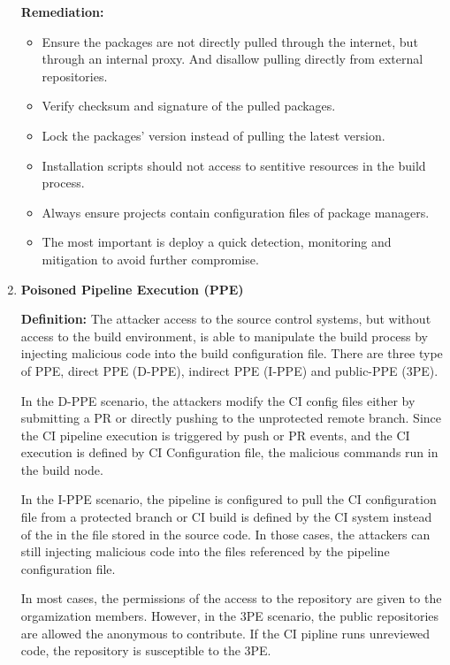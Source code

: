 \begin{enumerate}[label=(\arabic*)]
    \textbf{Remediation:}
        \begin{itemize}
            \item Ensure the packages are not directly pulled through the internet, 
            but through an internal proxy. And disallow pulling directly from external repositories.
            \item Verify checksum and signature of the pulled packages.
            \item Lock the packages' version instead of pulling the latest version.
            \item Installation scripts should not access to 
            sentitive resources in the build process.
            \item Always ensure projects contain configuration files of package managers.
            \item The most important is deploy a quick detection, 
            monitoring and mitigation to avoid further compromise.
        \end{itemize}
    \item \textbf{Poisoned Pipeline Execution (PPE)}

    \textbf{Definition: }
        The attacker access to the source control systems, but without access to the build environment, is
        able to manipulate the build process by injecting malicious code into the build configuration file.
        There are three type of PPE, direct PPE (D-PPE), indirect PPE (I-PPE) and public-PPE (3PE).

        In the D-PPE scenario, the attackers modify the CI config files either by submitting a PR or directly pushing to the unprotected
        remote branch. Since the CI pipeline execution is triggered by push or PR events, and the CI execution
        is defined by CI Configuration file, the malicious commands run in the build node.

        In the I-PPE scenario, the pipeline is configured to pull the CI configuration file from a protected 
        branch or CI build is defined by the CI system instead of the in the file stored in the source code.
        In those cases, the attackers can still injecting malicious code into the files referenced by the pipeline
        configuration file.

        In most cases, the permissions of the access to the repository are given to the orgamization
        members. However, in the 3PE scenario, the public repositories are allowed the anonymous to 
        contribute. If the CI pipline runs unreviewed code, the repository is susceptible to the 3PE.


\end{enumerate}
